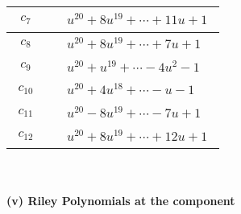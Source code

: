 \documentclass[1p]{elsarticle_modified}
\theoremstyle{definition}
\begin{document}
\begin{tabular}{m{50pt}|m{274pt}}
\hline $$\begin{aligned}c_{7}\end{aligned}$$&$\begin{aligned}
&u^{20}+8 u^{19}+\cdots+11 u+1
\end{aligned}$\\
\hline $$\begin{aligned}c_{8}\end{aligned}$$&$\begin{aligned}
&u^{20}+8 u^{19}+\cdots+7 u+1
\end{aligned}$\\
\hline $$\begin{aligned}c_{9}\end{aligned}$$&$\begin{aligned}
&u^{20}+u^{19}+\cdots-4 u^2-1
\end{aligned}$\\
\hline $$\begin{aligned}c_{10}\end{aligned}$$&$\begin{aligned}
&u^{20}+4 u^{18}+\cdots- u-1
\end{aligned}$\\
\hline $$\begin{aligned}c_{11}\end{aligned}$$&$\begin{aligned}
&u^{20}-8 u^{19}+\cdots-7 u+1
\end{aligned}$\\
\hline $$\begin{aligned}c_{12}\end{aligned}$$&$\begin{aligned}
&u^{20}+8 u^{19}+\cdots+12 u+1
\end{aligned}$\\
\hline
\end{tabular}\\~\\
\newpage\renewcommand{\arraystretch}{1}
\flushleft \textbf{(v) Riley Polynomials at the component}\newline \\
\end{document}
